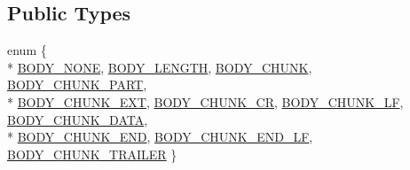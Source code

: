 \subsection*{Public Types}
\begin{DoxyCompactItemize}
\item 
enum \{ \\*
\hyperlink{structhttp__filter__ctx_aa3159b475aeee8e103259d1c95a334e8abd8ab22b23c1ff942a54ee9f06902cbe}{B\+O\+D\+Y\+\_\+\+N\+O\+NE}, 
\hyperlink{structhttp__filter__ctx_aa3159b475aeee8e103259d1c95a334e8aacae14c4226756b705f90bc4edbdcf6a}{B\+O\+D\+Y\+\_\+\+L\+E\+N\+G\+TH}, 
\hyperlink{structhttp__filter__ctx_aa3159b475aeee8e103259d1c95a334e8aaf0a69d71f0f7631f6944789ffe81738}{B\+O\+D\+Y\+\_\+\+C\+H\+U\+NK}, 
\hyperlink{structhttp__filter__ctx_aa3159b475aeee8e103259d1c95a334e8a5e2a4bae5c5d9f5d4f6d0212e3260e2f}{B\+O\+D\+Y\+\_\+\+C\+H\+U\+N\+K\+\_\+\+P\+A\+RT}, 
\\*
\hyperlink{structhttp__filter__ctx_aa3159b475aeee8e103259d1c95a334e8a408d3b74294cdc5a8be6c67abf8c6183}{B\+O\+D\+Y\+\_\+\+C\+H\+U\+N\+K\+\_\+\+E\+XT}, 
\hyperlink{structhttp__filter__ctx_aa3159b475aeee8e103259d1c95a334e8aeb24c50e5c4248563512a8c09e6fa1fb}{B\+O\+D\+Y\+\_\+\+C\+H\+U\+N\+K\+\_\+\+CR}, 
\hyperlink{structhttp__filter__ctx_aa3159b475aeee8e103259d1c95a334e8af5e3abb711e1c2e2d4ed1a18b4ff29e6}{B\+O\+D\+Y\+\_\+\+C\+H\+U\+N\+K\+\_\+\+LF}, 
\hyperlink{structhttp__filter__ctx_aa3159b475aeee8e103259d1c95a334e8adf1346fa548e4fa5e3d0cfe1b897674d}{B\+O\+D\+Y\+\_\+\+C\+H\+U\+N\+K\+\_\+\+D\+A\+TA}, 
\\*
\hyperlink{structhttp__filter__ctx_aa3159b475aeee8e103259d1c95a334e8a887476948904160a7e5c664d9ab0d9c1}{B\+O\+D\+Y\+\_\+\+C\+H\+U\+N\+K\+\_\+\+E\+ND}, 
\hyperlink{structhttp__filter__ctx_aa3159b475aeee8e103259d1c95a334e8a6069fef627be035a8cc17783de3babb4}{B\+O\+D\+Y\+\_\+\+C\+H\+U\+N\+K\+\_\+\+E\+N\+D\+\_\+\+LF}, 
\hyperlink{structhttp__filter__ctx_aa3159b475aeee8e103259d1c95a334e8ae2d79e740da9b93106e9ce02c88d0068}{B\+O\+D\+Y\+\_\+\+C\+H\+U\+N\+K\+\_\+\+T\+R\+A\+I\+L\+ER}
 \}
\end{DoxyCompactItemize}
